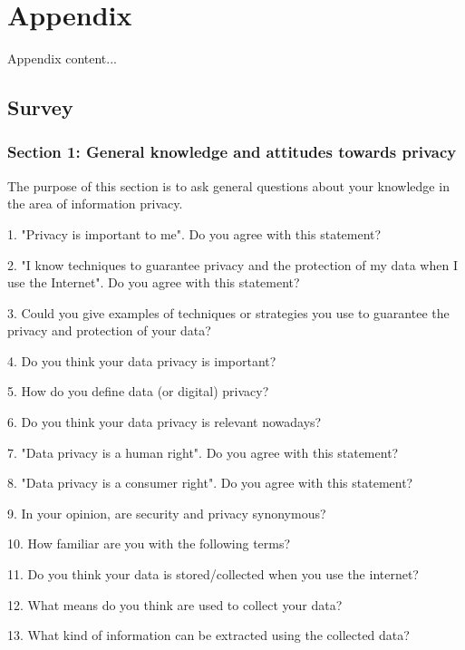 %
%
\chapter*{Appendix}

Appendix content...

\section*{Survey}
\label{appendix:survey}

\subsection*{Section 1: General knowledge and attitudes towards privacy}

The purpose of this section is to ask general questions about your knowledge
in the area of information privacy.

1. "Privacy is important to me". Do you agree with this statement?

2. "I know techniques to guarantee privacy and the protection of my data when I use the Internet". Do you agree with this statement?

3. Could you give examples of techniques or strategies you use to guarantee the privacy and protection of your data?


4. Do you think your data privacy is important?


5. How do you define data (or digital) privacy?


6. Do you think your data privacy is relevant nowadays?


7. "Data privacy is a human right". Do you agree with this statement?


8. "Data privacy is a consumer right". Do you agree with this statement?


9. In your opinion, are security and privacy synonymous?


10. How familiar are you with the following terms?


11. Do you think your data is stored/collected when you use the internet?


12. What means do you think are used to collect your data?


13. What kind of information can be extracted using the collected data?


